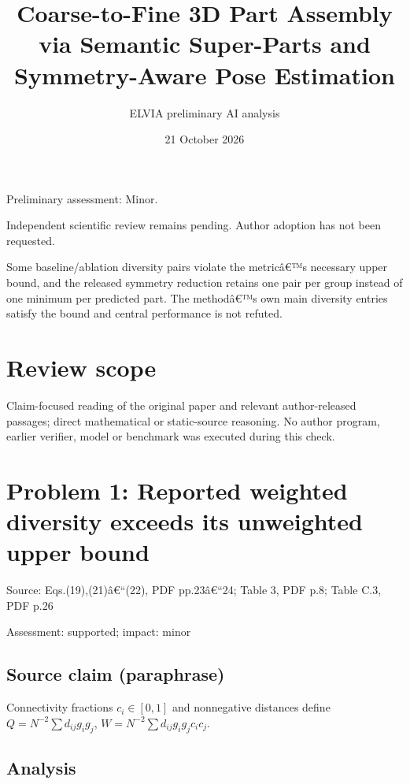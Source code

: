 \documentclass[11pt]{article}
\begin{document}
\title{Coarse-to-Fine 3D Part Assembly via Semantic Super-Parts and Symmetry-Aware Pose Estimation}

\author{ELVIA preliminary AI analysis}\date{21 October 2026}\maketitle

Preliminary assessment: Minor.\par

Independent scientific review remains pending. Author adoption has not been requested.

Some baseline/ablation diversity pairs violate the metricâ€™s necessary upper bound, and the released symmetry reduction retains one pair per group instead of one minimum per predicted part. The methodâ€™s own main diversity entries satisfy the bound and central performance is not refuted.

\section*{Review scope}

Claim-focused reading of the original paper and relevant author-released passages; direct mathematical or static-source reasoning. No author program, earlier verifier, model or benchmark was executed during this check.

\section*{Problem 1: Reported weighted diversity exceeds its unweighted upper bound}

Source: Eqs.(19),(21)â€“(22), PDF pp.23â€“24; Table 3, PDF p.8; Table C.3, PDF p.26

Assessment: supported; impact: minor

\subsection*{Source claim (paraphrase)}

Connectivity fractions \(c_i\in[0,1]\) and nonnegative distances define \(Q=N^{-2}\sum d_{ij}g_ig_j\), \(W=N^{-2}\sum d_{ij}g_ig_jc_ic_j\).

\subsection*{Analysis}
\end{document}
